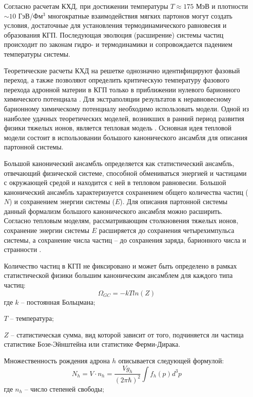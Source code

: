Согласно расчетам КХД, при достижении температуры $T\approx175$ МэВ и плотности $\sim10$ ГэВ/Фм$^3$ многократные взаимодействия мягких партонов могут создать условия, достаточные для установления термодинамического равновесия и образования КГП\cite{QGP}. Последующая эволюция (расширение) системы частиц происходит по законам гидро- и термодинамики и сопровождается падением температуры системы. 

Теоретические расчеты КХД на решетке однозначно идентифицируют фазовый переход, а также позволяют определить критическую температуру фазового перехода адронной материи в КГП только в приближении нулевого барионного химического потенциала \cite{LatticeQCD_PhaseTransition1, LatticeQCD_PhaseTransition2}. 
Для экстраполяции результатов к неравновесному барионному химическому потенциалу необходимо использовать модели. Одной из наиболее удачных теоретических моделей, возникших в ранний период развития физики тяжелых ионов, является тепловая модель \cite{ThermalModel}. Основная идея тепловой модели состоит в использовании большого канонического ансамбля для описания партонной системы. 

Большой канонический ансамбль определяется как статистический ансамбль, отвечающий физической системе, способной обмениваться энергией и частицами с окружающей средой и находится с ней в тепловом равновесии.  Большой канонический ансамбль характеризуется сохранением общего количества частиц ($N$) и сохранением энергии системы ($E$). Для описания партонной системы данный формализм  большого канонического ансамбля можно расширить. Согласно тепловым моделям, рассматривающим столкновения тяжелых ионов, сохранение энергии системы $E$ расширяется до сохранения четырехимпульса системы, а сохранение числа частиц -- до сохранения заряда, барионного числа и странности \cite{ThermalModel}. 

Количество частиц в КГП не фиксировано и может быть определено в рамках статистической физики большим каноническим ансамблем для каждого типа частиц:
$$\Omega_{GC} = -kT ln(Z)$$
где $k$ – постоянная Больцмана;
 
$T$ – температура;

$Z$ -- статистическая сумма, вид которой зависит от того, подчиняется ли частица статистике Бозе-Эйнштейна или статистике Ферми-Дирака.

Множественность рождения адрона $h$ описывается следующей формулой:
$$ N_h = V\cdot n_h = \frac{V g_h}{(2 \pi \hbar)^2} \int f_h(p)d^3p$$
где $n_h$ – число степеней свободы;

